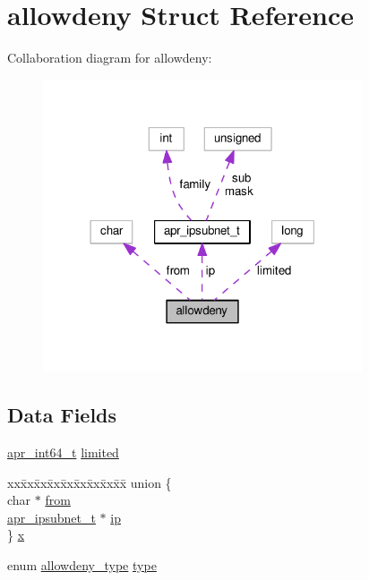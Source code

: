 \hypertarget{structallowdeny}{}\section{allowdeny Struct Reference}
\label{structallowdeny}


Collaboration diagram for allowdeny\+:
\nopagebreak
\begin{figure}[H]
\begin{center}
\leavevmode
\includegraphics[width=267pt]{structallowdeny__coll__graph}
\end{center}
\end{figure}
\subsection*{Data Fields}
\begin{DoxyCompactItemize}
\item 
\hyperlink{group__apr__platform_ga4b75afbf973dc6c8aea4ae75b044aa08}{apr\+\_\+int64\+\_\+t} \hyperlink{structallowdeny_a75cb207dd4fae5b89c3151d8d4854648}{limited}
\item 
\begin{tabbing}
xx\=xx\=xx\=xx\=xx\=xx\=xx\=xx\=xx\=\kill
union \{\\
\>char $\ast$ \hyperlink{structallowdeny_a099624af215178aa19faa842d24d7e9e}{from}\\
\>\hyperlink{structapr__ipsubnet__t}{apr\_ipsubnet\_t} $\ast$ \hyperlink{structallowdeny_a799bf95af08633490efe4951bd06def8}{ip}\\
\} \hyperlink{structallowdeny_a59a9e8f859af9f3801500f6670c627e0}{x}\\

\end{tabbing}\item 
enum \hyperlink{mod__access__compat_8c_aefa49b8db4ec0890f3c9d91df52f750c}{allowdeny\+\_\+type} \hyperlink{structallowdeny_a7e46379af107dfe29b97664949271083}{type}
\end{DoxyCompactItemize}



